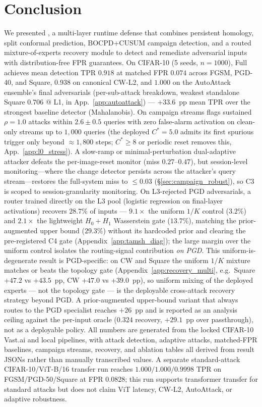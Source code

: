 \section{Conclusion}
\label{sec:conclusion}

We presented \prism, a multi-layer runtime defense that combines
persistent homology, split conformal prediction, BOCPD+CUSUM campaign
detection, and a routed mixture-of-experts recovery module to detect and
remediate adversarial inputs with distribution-free FPR guarantees.
On CIFAR-10 (5 seeds, $n{=}1000$), \prism Full achieves mean detection TPR
$0.918$ at matched FPR $0.074$ across FGSM, PGD-40, and Square, $0.938$ on
canonical CW-L2, and $1.000$ on the AutoAttack ensemble's final
adversarials (per-sub-attack breakdown, weakest standalone Square
$0.706$ @ L1, in App.~\ref{app:autoattack}) --- $+33.6$~pp mean TPR over the
strongest baseline detector (Mahalanobis). On campaign streams \sacd flags
sustained $\rho{=}1.0$ attacks within $2.6 \pm 0.5$ queries with zero
false-alarm activation on clean-only streams up to $1{,}000$ queries
(the deployed $C^*{=}5.0$ admits its first spurious trigger only beyond
$\approx 1{,}800$ steps; $C^*{\geq}8$ or periodic reset removes this,
App.~\ref{app:l0_stress}). A slow-ramp or minimal-perturbation dual-adaptive
attacker defeats the per-image-reset monitor (miss $0.27$--$0.47$), but
session-level monitoring---where the change detector persists across the
attacker's query stream---restores the full-system miss to ${\le}0.03$
(\S\ref{sec:campaign_robust}), so C3 is scoped to session-granularity
monitoring. On L3-rejected PGD
adversarials, a \tamsh router trained directly on the L3 pool (logistic
regression on final-layer activations) recovers $28.7\%$ of inputs ---
$9.1\times$ the uniform $1/K$ control ($3.2\%$) and $2.1\times$ the
lightweight $H_0{+}H_1$ Wasserstein gate ($13.7\%$), matching the
prior-augmented upper bound ($29.3\%$) without its hardcoded prior and
clearing the pre-registered C4 gate
(Appendix~\ref{app:tamsh_diag}); the large margin over the uniform
control isolates the routing-signal contribution \emph{on PGD}. This
uniform-is-degenerate result is PGD-specific: on CW and Square the
uniform $1/K$ mixture matches or beats the topology gate
(Appendix~\ref{app:recovery_multi}, e.g.\ Square $+47.2$ vs $+43.5$~pp,
CW $+47.0$ vs $+39.0$~pp), so uniform mixing of the deployed experts ---
not the topology gate --- is the deployable cross-attack recovery
strategy beyond PGD. A prior-augmented upper-bound variant that always
routes to the PGD specialist reaches $+26$~pp and is reported as an
analysis ceiling against the per-input oracle ($0.324$ recovery,
$+29.1$~pp over passthrough), not as a deployable policy. All numbers
are generated from the locked CIFAR-10 Vast.ai and local pipelines,
with attack detection, adaptive attacks, matched-FPR baselines, campaign
streams, recovery, and ablation tables all derived from result JSONs
rather than manually transcribed values. A separate standard-attack
CIFAR-10/ViT-B/16 transfer run reaches $1.000/1.000/0.9998$ TPR on
FGSM/PGD-50/Square at FPR $0.0828$; this run supports transformer
transfer for standard attacks but does not claim ViT latency, CW-L2,
AutoAttack, or adaptive robustness.

